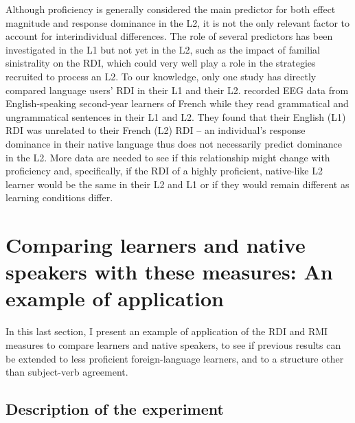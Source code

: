 \documentclass[output=paper,colorlinks,citecolor=brown,modfonts,nonflat]{../langscibook}
\begin{document}
Although proficiency is generally considered the main predictor for both effect magnitude and response dominance in the L2, it is not the only relevant factor to account for interindividual differences. The role of several predictors has been investigated in the L1 but not yet in the L2, such as the impact of familial sinistrality on the RDI, which could very well play a role in the strategies recruited to process an L2. To our knowledge, only one study has directly compared language users’ RDI in their L1 and their L2. \citet{WamplerEtAl2014} recorded EEG data from English-speaking second-year learners of French while they read grammatical and ungrammatical sentences in their L1 and L2. They found that their English (L1) RDI was unrelated to their French (L2) RDI – an individual’s response dominance in their native language thus does not necessarily predict dominance in the L2. More data are needed to see if this relationship might change with proficiency and, specifically, if the RDI of a highly proficient, native-like L2 learner would be the same in their L2 and L1 or if they would remain different as learning conditions differ.   

\section{Comparing learners and native speakers with these measures: An example of application}


In this last section, I present an example of application of the RDI and RMI measures to compare learners and native speakers, to see if previous results can be extended to less proficient foreign-language learners, and to a structure other than subject-verb agreement.

\subsection{Description of the experiment}
\end{document}
